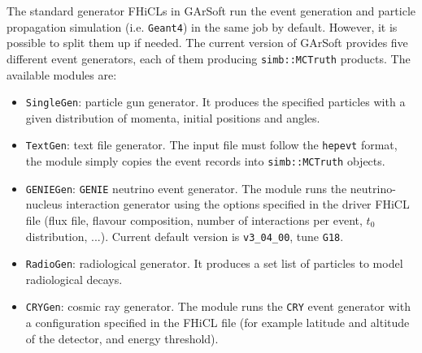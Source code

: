 The standard generator FHiCLs in GArSoft run the event generation and particle propagation simulation (i.e. \texttt{Geant4}) in the same job by default. However, it is possible to split them up if needed. The current version of GArSoft provides five different event generators, each of them producing \texttt{simb::MCTruth} products. The available modules are:
\begin{itemize}
	\item \texttt{SingleGen}: particle gun generator. It produces the specified particles with a given distribution of momenta, initial positions and angles.
	\item \texttt{TextGen}: text file generator. The input file must follow the \texttt{hepevt} format, the module simply copies the event records into \texttt{simb::MCTruth} objects.
	\item \texttt{GENIEGen}: \texttt{GENIE} neutrino event generator. The module runs the neutrino-nucleus interaction generator using the options specified in the driver FHiCL file (flux file, flavour composition, number of interactions per event, $t_{0}$ distribution, ...). Current default version is \texttt{v3_04_00}, tune \texttt{G18}.
	\item \texttt{RadioGen}: radiological generator. It produces a set list of particles to model radiological decays.
	\item \texttt{CRYGen}: cosmic ray generator. The module runs the \texttt{CRY} event generator \cite{Hagmann2007} with a configuration specified in the FHiCL file (for example latitude and altitude of the detector, and energy threshold).
\end{itemize}

